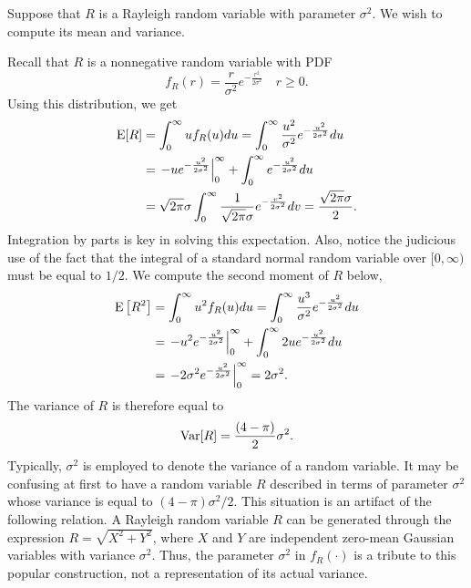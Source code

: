 \begin{example}
Suppose that $R$ is a Rayleigh random variable with parameter $\sigma^2$.
We wish to compute its mean and variance.

Recall that $R$ is a nonnegative random variable with PDF
\begin{equation*}
f_R (r) = \frac{r}{\sigma^2} e^{- \frac{r^2}{2 \sigma^2} } \quad r \geq 0 .
\end{equation*}
Using this distribution, we get
\begin{equation*}
\begin{split}
\mathrm{E} [R] &= \int_0^{\infty} u f_R(u) du
= \int_0^{\infty} \frac{u^2}{\sigma^2} e^{- \frac{u^2}{2 \sigma^2}} du \\
&= \left. - u e^{- \frac{u^2}{2 \sigma^2}} \right|_0^{\infty}
+ \int_0^{\infty} e^{- \frac{u^2}{2 \sigma^2}} du \\
&= \sqrt{ 2 \pi } \sigma
\int_0^{\infty} \frac{1}{\sqrt{2 \pi} \sigma} e^{- \frac{v^2}{2 \sigma^2}} dv
= \frac{\sqrt{2 \pi} \sigma}{2} .
\end{split}
\end{equation*}
Integration by parts is key in solving this expectation.
Also, notice the judicious use of the fact that the integral of a standard normal random variable over $[0, \infty)$ must be equal to $1/2$.
We compute the second moment of $R$ below,
\begin{equation*}
\begin{split}
\mathrm{E} \left[ R^2 \right] &= \int_0^{\infty} u^2 f_R(u) du
= \int_0^{\infty} \frac{u^3}{\sigma^2} e^{- \frac{u^2}{2 \sigma^2}} du \\
&= \left. - u^2 e^{- \frac{u^2}{2 \sigma^2}} \right|_0^{\infty}
+ \int_0^{\infty} 2 u e^{- \frac{u^2}{2 \sigma^2}} du \\
&= \left. - 2 \sigma^2 e^{- \frac{u^2}{2 \sigma^2}} \right|_0^{\infty}
= 2 \sigma^2 .
\end{split}
\end{equation*}
The variance of $R$ is therefore equal to
\begin{equation*}
\mathrm{Var} [R] = \frac{(4 - \pi)}{2} \sigma^2 .
\end{equation*}
Typically, $\sigma^2$ is employed to denote the variance of a random variable.
It may be confusing at first to have a random variable $R$ described in terms of parameter $\sigma^2$ whose variance is equal to $(4 - \pi) \sigma^2/2$.
This situation is an artifact of the following relation.
A Rayleigh random variable $R$ can be generated through the expression $R = \sqrt{X^2 + Y^2}$, where $X$ and $Y$ are independent zero-mean Gaussian variables with variance $\sigma^2$.
Thus, the parameter $\sigma^2$ in $f_R (\cdot)$ is a tribute to this popular construction, not a representation of its actual variance.
\end{example}


